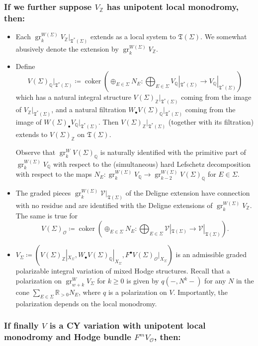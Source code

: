 \documentclass{amsart}
\newcommand{\coker}{\operatorname{coker}}
\theoremstyle{definition}
\theoremstyle{remark}
\def\bZ{\mathbb{Z}}
\def\bQ{\mathbb{Q}}
\def\bR{\mathbb{R}}
\def\cO{\mathcal{O}}
\def\cV{\mathcal{V}}
\def\fT{\mathfrak{T}}
\def\gr{\operatorname{gr}}
\def\pmax{m}
\def\fT{\mathfrak{T}}
\numberwithin{equation}{section}
\begin{document}
\subsubsection{If we further suppose $V_\bZ$ has unipotent local monodromy, then:}
\begin{itemize}
\item Each $\gr^{W(\Sigma)}_k V_\bZ|_{\fT^*(\Sigma)}$ extends as a local system to $\mathfrak{T}(\Sigma)$. We somewhat abusively denote the extension by $\gr^{W(\Sigma)}_k V_\bZ$.
\item Define 
\[V(\Sigma)_\bQ|_{\fT^*(\Sigma)}\coloneqq  \coker\left(\oplus_{E\in \Sigma}N_E:\bigoplus_{E\in \Sigma}V_\bQ|_{\fT^*(\Sigma)}\to V_\bQ|_{\fT^*(\Sigma)}\right)\]
which has a natural integral structure $V(\Sigma)_\bZ|_{\fT^*(\Sigma)}$ coming from the image of $V_\bZ|_{\fT^*(\Sigma)}$, and a natural filtration $W_\bullet V(\Sigma)_\bQ|_{\fT^*(\Sigma)}$ coming from the image of $W(\Sigma)_\bullet V_\bQ|_{\fT^*(\Sigma)}$.  Then $V(\Sigma)_\bZ|_{\fT^*(\Sigma)}$ (together with its filtration) extends to $V(\Sigma)_\bZ$ on $\mathfrak{T}(\Sigma)$.

Observe that $\gr^W_k V(\Sigma)_\bQ$ is naturally identified with the primitive
part of $\gr^{W(\Sigma)}_k V_\bQ$ with respect to the (simultaneous) hard Lefschetz decomposition with respect to the maps $N_E:\gr^{W(\Sigma)}_{k}V_\bQ\to \gr^{W(\Sigma)}_{k-2}V(\Sigma)_\bQ$ for $E\in\Sigma$.

\item The graded pieces $\gr^{W(\Sigma)}_k \cV|_{\mathfrak{T}(\Sigma)}$ of the Deligne extension have connection with no residue and are identified with the Deligne extensions of $\gr^{W(\Sigma)}_kV_\bZ$.  The same is true for 
\[ V(\Sigma)_\cO\coloneqq  \coker\left(\oplus_{E\in \Sigma}N_E:\bigoplus_{E\in \Sigma} \cV|_{\mathfrak{T}(\Sigma)}\to \cV|_{\mathfrak{T}(\Sigma)}\right).\]

   
    \item  $V_\Sigma\coloneqq  (V(\Sigma)_\bZ|_{X_\Sigma}, W_\bullet V(\Sigma)_\bQ|_{X_\Sigma},F^\bullet V(\Sigma)_\cO|_{X_\Sigma})$ is an admissible graded polarizable integral variation of mixed Hodge structures.  Recall that a polarization on $\gr^W_{w+k}V_\Sigma$ for $k\geq 0$ is given by $q(-,N^k-)$ for any $N$ in the cone $\sum_{E\in\Sigma} \bR_{>0}N_E $, where $q$ is a polarization on $V$.  Importantly, the polarization depends on the local monodromy. 
    \end{itemize}
   
    
\subsubsection{    If finally $V$ is a CY variation with unipotent local monodromy and Hodge bundle $F^\pmax V_\cO$, then:}\label{subsub:CY with unip}
  
\end{document}
